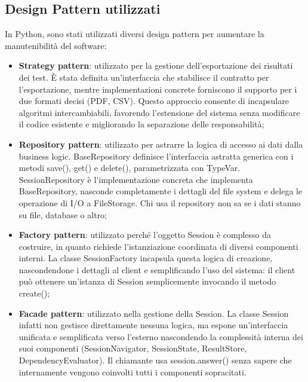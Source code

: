 \documentclass[a4paper,12pt]{article}
\begin{document}
        \subsection{Design Pattern utilizzati}
            In Python, sono stati utilizzati diversi design pattern per aumentare la manutenibilità del software:
            \begin{itemize}
                \item \textbf{Strategy pattern}: utilizzato per la gestione dell'esportazione dei risultati dei test. È stata definita un'interfaccia che stabilisce il contratto per 
                    l'esportazione, mentre implementazioni concrete forniscono il supporto per i due formati decisi (PDF, CSV). Questo approccio consente di incapsulare algoritmi intercambiabili, 
                    favorendo l'estensione del sistema senza modificare il codice esistente e migliorando la separazione delle responsabilità;
                \item \textbf{Repository pattern}: utilizzato per astrarre la logica di accesso ai dati dalla business logic. BaseRepository definisce l'interfaccia astratta generica con i metodi 
                    {\ttfamily save(), get()} e {\ttfamily delete()}, parametrizzata con TypeVar. SessionRepository è l'implementazione concreta che implementa BaseRepository, nasconde completamente i 
                    dettagli del file system e delega le operazione di I/O a FileStorage. Chi usa il repository non sa se i dati stanno su file, database o altro;
                \item \textbf{Factory pattern}: utilizzato perché l'oggetto Session è complesso da costruire, in quanto richiede l'istanziazione coordinata di diversi componenti interni.
                    La classe SessionFactory incapsula questa logica di creazione, nascondendone i dettagli al client e semplificando l'uso del sistema: il client può ottenere un'istanza di Session 
                    semplicemente invocando il metodo {\ttfamily create()};
                \item \textbf{Facade pattern}: utilizzato nella gestione della Session. La classe Session infatti non gestisce direttamente nessuna logica, ma espone un'interfaccia unificata e 
                    semplificata verso l'esterno nascondendo la complessità interna dei suoi componenti (SessionNavigator, SessionState, ResultStore, DependencyEvaluator). Il chiamante usa {\ttfamily session.answer()}
                    senza sapere che internamente vengono coinvolti tutti i componenti sopracitati.
            \end{itemize}
                    
    
\end{document}
